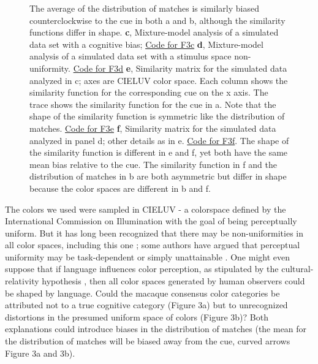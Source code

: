 \documentclass[9pt,biorxiv,lineno,onehalfspacing]{lapreprint}
\begin{document}
\begin{refsection}
\begin{figure}
\begin{fullwidth}
{    The average of the distribution of matches is similarly biased counterclockwise to the cue in both a and b, although the similarity functions differ in shape. \textbf{c}, Mixture-model analysis of a simulated data set with a cognitive bias; \href{https://github.com/NEI-LSR/MacaqueColorCategories/blob/main/Outputs/Paper/Figures/working/F3_TCCModel/Code/F3ace_TCCModel_OffsetGaussian.m}{Code for F3c} \textbf{d}, Mixture-model analysis of a simulated data set with a stimulus space non-uniformity. 
    \href{https://github.com/NEI-LSR/MacaqueColorCategories/blob/main/Outputs/Paper/Figures/working/F3_TCCModel/Code/F3bdf_TCCModel_StimulusSpaceNonUnifomity.m}{Code for F3d}
    \textbf{e}, Similarity matrix for the simulated data analyzed in c; axes are CIELUV color space. 
    Each column shows the similarity function for the corresponding cue on the x axis. 
    The trace shows the similarity function for the cue in a. 
    Note that the shape of the similarity function is symmetric like the distribution of matches. \href{https://github.com/NEI-LSR/MacaqueColorCategories/blob/main/Outputs/Paper/Figures/working/F3_TCCModel/Code/F3ace_TCCModel_OffsetGaussian.m}{Code for F3e} \textbf{f}, Similarity matrix for the simulated data analyzed in panel d; other details as in e. 
    \href{https://github.com/NEI-LSR/MacaqueColorCategories/blob/main/Outputs/Paper/Figures/working/F3_TCCModel/Code/F3bdf_TCCModel_StimulusSpaceNonUnifomity.m}{Code for F3f}. The shape of the similarity function is different in e and f, yet both have the same mean bias relative to the cue. 
    The similarity function in f and the distribution of matches in b are both asymmetric but differ in shape because the color spaces are different in b and f.}
    \label{fig:TCCDemo}
    \end{fullwidth}
\end{figure}

The colors we used were sampled in CIELUV - a colorspace defined by the International Commission on Illumination with the goal of being perceptually uniform. 
But it has long been recognized that there may be non-uniformities in all color spaces, including this one \citep{stockman_colorimetry_2010}; some authors have argued that perceptual uniformity may be task-dependent or simply unattainable \citep{judd_ideal_1970,bujack_non-riemannian_2022}. 
One might even suppose that if language influences color perception, as stipulated by the cultural-relativity hypothesis \citep{roberson_color_2005}, then all color spaces generated by human observers could be shaped by language. 
Could the macaque consensus color categories be attributed not to a true cognitive category (Figure 3a) but to unrecognized distortions in the presumed uniform space of colors (Figure 3b)? 
Both explanations could introduce biases in the distribution of matches (the mean for the distribution of matches will be biased away from the cue, curved arrows Figure 3a and 3b).


\end{refsection}
\end{document}
